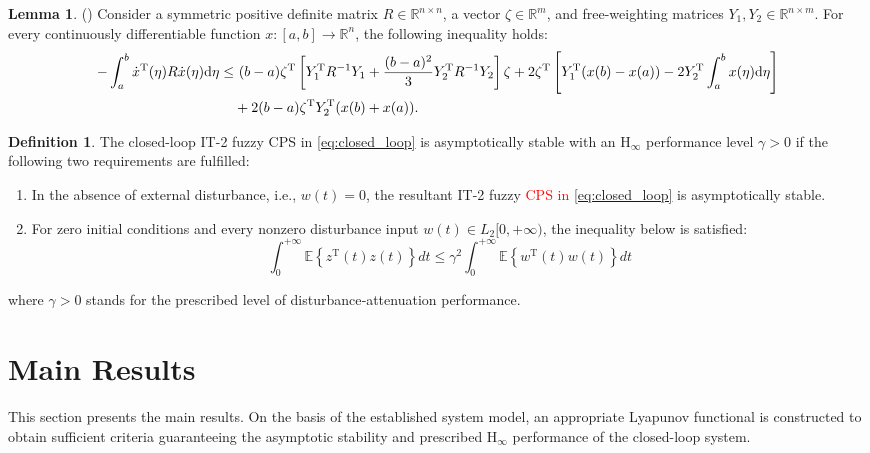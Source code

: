 \documentclass[preprint,review,fleqn,sort&compress,3p]{elsarticle}
\theoremstyle{definition} %
\theoremstyle{definition}%
\newtheorem{Lem}{Lemma}[section]
\newtheorem{Def}{Definition}[section]
\begin{document}
	\begin{Lem}\label{lem2}(\cite{guanModifiedLoopedFunctional2021a}) 
		Consider a symmetric positive definite matrix $R \in \mathbb{R}^{n\times n}$, a vector $\zeta \in \mathbb{R}^{m}$, and free-weighting matrices $Y_1, Y_2 \in \mathbb{R}^{n\times m}$. For every continuously differentiable function $x : [a,b] \rightarrow \mathbb{R}^{n}$, the following inequality holds:
		\begin{align}
			-\int_{a}^{b} \dot{x}^{\mathrm{T}}(\eta) R \dot{x}(\eta) \mathrm{d}\eta 
			\le & \ (b-a) \zeta^{\mathrm{T}} \left[ Y_1^{\mathrm{T}} R^{-1} Y_1 
			+ \frac{(b-a)^2}{3} Y_2^{\mathrm{T}} R^{-1} Y_2 \right] \zeta 
			+ 2\zeta^{\mathrm{T}} \left[ Y_1^{\mathrm{T}} (x(b) - x(a)) 
			- 2Y_2^{\mathrm{T}} \int_{a}^{b} x(\eta)\mathrm{d}\eta \right] \notag \\
			& + 2(b-a) \zeta^{\mathrm{T}} Y_2^{\mathrm{T}} (x(b) + x(a)).
		\end{align}
	\end{Lem} 
	
	\begin{Def}\label{Def1}
		The closed-loop IT-2 fuzzy CPS in \eqref{eq:closed_loop} is asymptotically stable with an $\mathrm{H}_\infty$ performance level $\gamma>0$ if the following two requirements are fulfilled:
		
		\begin{enumerate}
			\item In the absence of external disturbance, i.e., $w(t)=0$, the resultant IT-2 fuzzy \textcolor{red}{CPS in} \eqref{eq:closed_loop} is asymptotically stable.
			
			\item For zero initial conditions and every nonzero disturbance input $w(t)\in L_2[0,+\infty)$, the inequality below is satisfied:
			\begin{equation}
				\int_0^{+\infty}
				\mathbb E\left\{
				z^\mathrm{T}(t)z(t)
				\right\}dt
				\le
				\gamma^2
				\int_0^{+\infty}
				\mathbb E\left\{
				w^\mathrm{T}(t)w(t)
				\right\}dt
			\end{equation}
		\end{enumerate}
		where $\gamma>0$ stands for the prescribed level of disturbance‑attenuation performance.
		
	\end{Def}
	
	\section{Main Results}\label{sec3}
	This section presents the main results. On the basis of the established system model, an appropriate Lyapunov functional is constructed to obtain sufficient criteria guaranteeing the asymptotic stability and prescribed $\mathrm{H}_\infty$ performance of the closed-loop system.
	
\end{document}
